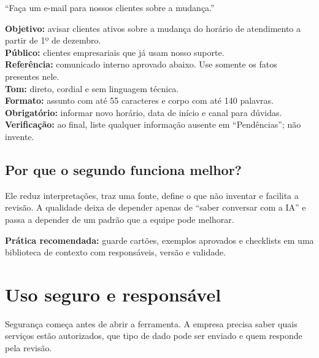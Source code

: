 \documentclass[11pt,a4paper]{article}
\begin{document}
\begin{tcolorbox}[colback=red!3,colframe=red!45!black,title={ANTES · pedido vago},fonttitle=\bfseries]
“Faça um e-mail para nossos clientes sobre a mudança.”
\end{tcolorbox}

\begin{tcolorbox}[colback=brandmint!6,colframe=brandmint,title={DEPOIS · contexto organizado},fonttitle=\bfseries]
\textbf{Objetivo:} avisar clientes ativos sobre a mudança do horário de atendimento a partir de 1º de dezembro.\\
\textbf{Público:} clientes empresariais que já usam nosso suporte.\\
\textbf{Referência:} comunicado interno aprovado abaixo. Use somente os fatos presentes nele.\\
\textbf{Tom:} direto, cordial e sem linguagem técnica.\\
\textbf{Formato:} assunto com até 55 caracteres e corpo com até 140 palavras.\\
\textbf{Obrigatório:} informar novo horário, data de início e canal para dúvidas.\\
\textbf{Verificação:} ao final, liste qualquer informação ausente em “Pendências”; não invente.
\end{tcolorbox}

\subsection*{Por que o segundo funciona melhor?}

Ele reduz interpretações, traz uma fonte, define o que não inventar e facilita a revisão. A qualidade deixa de depender apenas de “saber conversar com a IA” e passa a depender de um padrão que a equipe pode melhorar.

\begin{destaque}
\textbf{Prática recomendada:} guarde cartões, exemplos aprovados e checklists em uma biblioteca de contexto com responsáveis, versão e validade.
\end{destaque}

\newpage
\section{Uso seguro e responsável}

Segurança começa antes de abrir a ferramenta. A empresa precisa saber quais serviços estão autorizados, que tipo de dado pode ser enviado e quem responde pela revisão.
\end{document}
